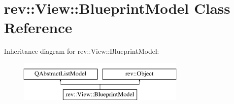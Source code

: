 \hypertarget{classrev_1_1_view_1_1_blueprint_model}{}\section{rev\+::View\+::Blueprint\+Model Class Reference}
\label{classrev_1_1_view_1_1_blueprint_model}
Inheritance diagram for rev\+::View\+::Blueprint\+Model\+:\begin{figure}[H]
\begin{center}
\leavevmode
\includegraphics[height=2.000000cm]{classrev_1_1_view_1_1_blueprint_model}
\end{center}
\end{figure}
